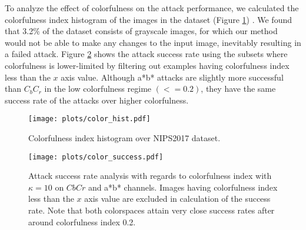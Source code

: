 To analyze the effect of colorfulness on the attack performance, we calculated the colorfulness index histogram of the images in the dataset (Figure \ref{fig:hist}) . We found that 3.2\% of the dataset consists of grayscale images, for which our method would not be able to make any changes to the input image, inevitably resulting in a failed attack. Figure \ref{fig:plots} shows the attack success rate using the subsets where colorfulness is lower-limited by filtering out examples having colorfulness index less than the \(x\) axis value. Although a*b* attacks are slightly more successful than \(C_bC_r\) in the low colorfulness regime \((<=0.2)\), they have the same success rate of the attacks over higher colorfulness.


\begin{figure}[t]

    \begin{center}
        \texttt{[image: plots/color\_hist.pdf]}
    \end{center}
    \caption{Colorfulness index histogram over NIPS2017 dataset.}\label{fig:hist}
\end{figure}
\begin{figure}[t]
    \begin{center}
        \texttt{[image: plots/color\_success.pdf]}
    \end{center}
    \caption[Attack success rate analysis with regards to colorfulness index with \(\kappa=10\) on \(CbCr\) and a*b* channels.]{Attack success rate analysis with regards to colorfulness index with \(\kappa=10\) on \(CbCr\) and a*b* channels. Images having colorfulness index less than the \(x\) axis value are excluded in calculation of the success rate. Note that both colorspaces attain very close success rates after around colorfulness index 0.2.} \label{fig:plots}
\end{figure}


